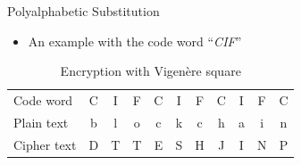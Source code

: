 \documentclass[]{beamer}
\begin{document}

\begin{frame}{Polyalphabetic Substitution}
	\begin{itemize}
		\centering
		\item<1-> An example with the code word ``\textit{CIF}''
	\end{itemize}
	\renewcommand{\arraystretch}{1.5}
	\begin{table}
		\centering
		\resizebox{9cm}{!} {
			\begin{tabular}{l c c c c c c c c c c }
				\hline
				Code word &C&I&F&C&I&F&C&I&F&C\\
				Plain text &b&l&o&c&k&c&h&a&i&n\\
				Cipher text &D&T&T&E&S&H&J&I&N&P\\
				\hline
			\end{tabular}
		}
		\caption{Encryption with Vigenère square}
	\end{table}
\end{frame}
\end{document}
